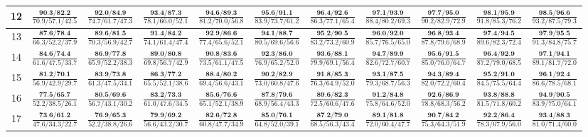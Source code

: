 \documentclass{slides}
\begin{document}
{{{\begin{tabular}{|c|c|c|c|c|c|c|c|c|c|c|}
\hline
12 & $\frac{\textbf{90.3/82.2}}{70.9/57.1/42.5}$ & $\frac{\textbf{92.0/84.9}}{74.7/61.7/47.3}$ & $\frac{\textbf{93.4/87.3}}{78.1/66.0/52.1}$ & $\frac{\textbf{94.6/89.3}}{81.2/70.0/56.8}$ & $\frac{\textbf{95.6/91.1}}{83.9/73.7/61.2}$ & $\frac{\textbf{96.4/92.6}}{86.3/77.1/65.4}$ & $\frac{\textbf{97.1/93.9}}{88.4/80.2/69.3}$ & $\frac{\textbf{97.7/95.0}}{90.2/82.9/72.9}$ & $\frac{\textbf{98.1/95.9}}{91.8/85.3/76.2}$ & $\frac{\textbf{98.5/96.6}}{93.2/87.5/79.3}$ \\
\hline
13 & $\frac{\textbf{87.6/78.4}}{66.3/52.2/37.9}$ & $\frac{\textbf{89.6/81.5}}{70.3/56.9/42.7}$ & $\frac{\textbf{91.4/84.2}}{74.1/61.4/47.4}$ & $\frac{\textbf{92.9/86.6}}{77.4/65.6/52.1}$ & $\frac{\textbf{94.1/88.7}}{80.5/69.6/56.6}$ & $\frac{\textbf{95.2/90.5}}{83.2/73.2/60.9}$ & $\frac{\textbf{96.0/92.0}}{85.7/76.5/65.0}$ & $\frac{\textbf{96.8/93.4}}{87.8/79.6/68.9}$ & $\frac{\textbf{97.4/94.5}}{89.6/82.3/72.4}$ & $\frac{\textbf{97.9/95.5}}{91.3/84.8/75.7}$ \\
\hline
14 & $\frac{\textbf{84.6/74.4}}{61.6/47.5/33.7}$ & $\frac{\textbf{86.9/77.8}}{65.9/52.2/38.3}$ & $\frac{\textbf{89.0/80.8}}{69.8/56.7/42.9}$ & $\frac{\textbf{90.8/83.6}}{73.5/61.1/47.5}$ & $\frac{\textbf{92.3/86.0}}{76.9/65.2/52.0}$ & $\frac{\textbf{93.6/88.1}}{79.9/69.1/56.4}$ & $\frac{\textbf{94.7/89.9}}{82.6/72.7/60.7}$ & $\frac{\textbf{95.6/91.5}}{85.0/76.0/64.7}$ & $\frac{\textbf{96.4/92.9}}{87.2/79.0/68.5}$ & $\frac{\textbf{97.1/94.1}}{89.1/81.7/72.0}$ \\
\hline
15 & $\frac{\textbf{81.2/70.1}}{56.9/42.9/29.7}$ & $\frac{\textbf{83.9/73.8}}{61.3/47.5/34.1}$ & $\frac{\textbf{86.3/77.2}}{65.5/52.1/38.6}$ & $\frac{\textbf{88.4/80.2}}{69.4/56.6/43.1}$ & $\frac{\textbf{90.2/82.9}}{73.0/60.8/47.6}$ & $\frac{\textbf{91.8/85.3}}{76.3/64.9/52.0}$ & $\frac{\textbf{93.1/87.5}}{79.3/68.7/56.3}$ & $\frac{\textbf{94.3/89.4}}{82.0/72.2/60.4}$ & $\frac{\textbf{95.2/91.0}}{84.5/75.5/64.4}$ & $\frac{\textbf{96.1/92.4}}{86.6/78.5/68.1}$ \\
\hline
16 & $\frac{\textbf{77.5/65.7}}{52.2/38.5/26.1}$ & $\frac{\textbf{80.5/69.6}}{56.7/43.1/30.2}$ & $\frac{\textbf{83.2/73.3}}{61.0/47.6/34.5}$ & $\frac{\textbf{85.6/76.6}}{65.1/52.1/38.9}$ & $\frac{\textbf{87.8/79.6}}{68.9/56.4/43.3}$ & $\frac{\textbf{89.6/82.3}}{72.5/60.6/47.6}$ & $\frac{\textbf{91.2/84.8}}{75.8/64.6/52.0}$ & $\frac{\textbf{92.6/86.9}}{78.8/68.3/56.2}$ & $\frac{\textbf{93.8/88.8}}{81.5/71.8/60.2}$ & $\frac{\textbf{94.9/90.5}}{83.9/75.0/64.1}$ \\
\hline
17 & $\frac{\textbf{73.6/61.2}}{47.6/34.3/22.7}$ & $\frac{\textbf{76.9/65.3}}{52.2/38.8/26.6}$ & $\frac{\textbf{79.9/69.2}}{56.6/43.2/30.7}$ & $\frac{\textbf{82.6/72.8}}{60.8/47.7/34.9}$ & $\frac{\textbf{85.0/76.1}}{64.8/52.0/39.1}$ & $\frac{\textbf{87.2/79.0}}{68.5/56.3/43.4}$ & $\frac{\textbf{89.1/81.8}}{72.0/60.4/47.7}$ & $\frac{\textbf{90.7/84.2}}{75.3/64.3/51.9}$ & $\frac{\textbf{92.2/86.4}}{78.3/67.9/56.0}$ & $\frac{\textbf{93.4/88.3}}{81.0/71.4/60.0}$ \\

\end{tabular}}}}
\end{document}
